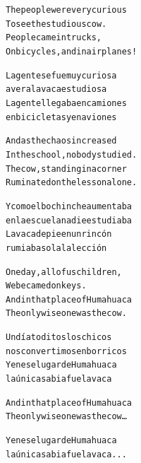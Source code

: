 \documentclass[11pt,a4paper]{article}
\begin{document}
\begin{parcolumns}{2}
\colchunk
{
\begin{alltt}\normalfont
The people were very curious
To see the studious cow.
People came in trucks,
On bicycles, and in airplanes!
\end{alltt}
}

\colchunk
{
\begin{alltt}\normalfont
La gente se fue muy curiosa
a ver a la vaca estudiosa
La gente llegaba en camiones
en bicicletas y en aviones
\end{alltt}
}

\colplacechunks

\colchunk
{
\begin{alltt}\normalfont
And as the chaos increased
In the school, nobody studied.
The cow, standing in a corner
Ruminated on the lesson alone.
\end{alltt}
}

\colchunk
{
\begin{alltt}\normalfont
Y como el bochinche aumentaba
en la escuela nadie estudiaba
La vaca de pie en un rincón
rumiaba sola la lección
\end{alltt}
}

\colplacechunks

\colchunk
{
\begin{alltt}\normalfont
One day, all of us children,
We became donkeys.
And in that place of Humahuaca
The only wise one was the cow.
\end{alltt}
}

\colchunk
{
\begin{alltt}\normalfont
Un día toditos los chicos
nos convertimos en borricos
Y en ese lugar de Humahuaca
la única sabia fue la vaca
\end{alltt}
}

\colplacechunks

\colchunk
{
\begin{alltt}\normalfont
And in that place of Humahuaca
The only wise one was the cow…
\end{alltt}
}

\colchunk
{
\begin{alltt}\normalfont
Y en ese lugar de Humahuaca
la única sabia fue la vaca...
\end{alltt}
}

\colplacechunks

\end{parcolumns}

\clearpage

\end{document}
